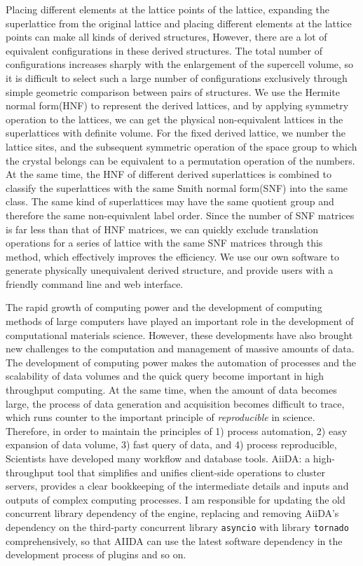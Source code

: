 \documentclass[phd,nobackinfo]{scutthesis}
\begin{document}
\begin{englishabstract}
Placing different elements at the lattice points of the lattice, expanding the superlattice from the original lattice and placing different elements at the lattice points can make all kinds of derived structures,
However, there are a lot of equivalent configurations in these derived structures.
The total number of configurations increases sharply with the enlargement of the supercell volume, so it is difficult to select such a large number of configurations exclusively through simple geometric comparison between pairs of structures.
We use the Hermite normal form(HNF) to represent the derived lattices, and by applying symmetry operation to the lattices, we can get the physical non-equivalent lattices in the superlattices with definite volume. For the fixed derived lattice, we number the lattice sites, and the subsequent symmetric operation of the space group to which the crystal belongs can be equivalent to a permutation operation of the numbers. At the same time, the HNF of different derived superlattices is combined to classify the superlattices with the same Smith normal form(SNF) into the same class. The same kind of superlattices may have the same quotient group and therefore the same non-equivalent label order. Since the number of SNF matrices is far less than that of HNF matrices, we can quickly exclude translation operations for a series of lattice with the same SNF matrices through this method, which effectively improves the efficiency.
We use our own software to generate physically unequivalent derived structure, and provide users with a friendly command line and web interface.

The rapid growth of computing power and the development of computing methods of large computers have played an important role in the development of computational materials science.
However, these developments have also brought new challenges to the computation and management of massive amounts of data.
The development of computing power makes the automation of processes and the scalability of data volumes and the quick query become important in high throughput computing.
At the same time, when the amount of data becomes large, the process of data generation and acquisition becomes difficult to trace, which runs counter to the important principle of \textit{reproducible} in science.
Therefore, in order to maintain the principles of 1) process automation, 2) easy expansion of data volume, 3) fast query of data, and 4) process reproducible,
Scientists have developed many workflow and database tools. AiiDA: a high-throughput tool that simplifies and unifies client-side operations to cluster servers, provides a clear bookkeeping of the intermediate details and inputs and outputs of complex computing processes.
I am responsible for updating the old concurrent library dependency of the engine, replacing and removing AiiDA's dependency on the third-party concurrent library \texttt{asyncio} with library \texttt{tornado} comprehensively, so that AIIDA can use the latest software dependency in the development process of plugins and so on.


\end{englishabstract}
\end{document}
